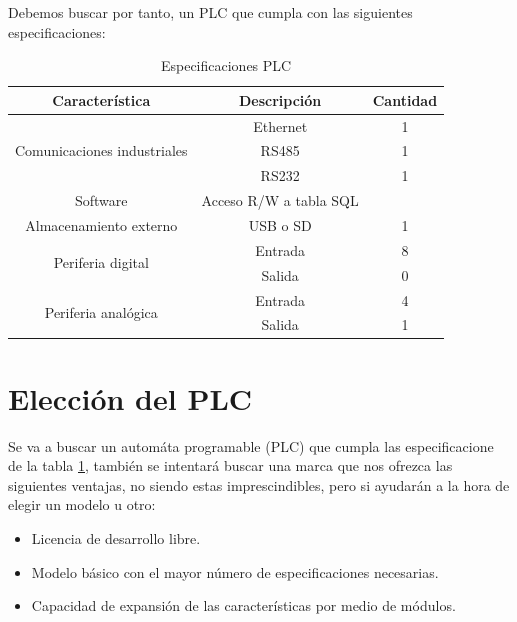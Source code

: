 Debemos buscar por tanto, un PLC que cumpla con las siguientes especificaciones:

\begin{table}[H]
\centering
\begin{tabular}{|c|c|c|}
\hline
\textbf{Característica }                              & \textbf{Descripción}            & \textbf{Cantidad} \\ \hline
\multirow{3}{*}{Comunicaciones industriales} & Ethernet               & 1        \\ \cline{2-3} 
                                             & RS485                  & 1        \\ \cline{2-3} 
                                             & RS232                  & 1        \\ \hline
Software                                     & Acceso R/W a tabla SQL &          \\ \hline
Almacenamiento externo                       & USB o SD               & 1        \\ \hline
\multirow{2}{*}{Periferia digital}           & Entrada                & 8        \\ \cline{2-3} 
                                             & Salida                 & 0        \\ \hline
\multirow{2}{*}{Periferia analógica}         & Entrada                & 4        \\ \cline{2-3} 
                                             & Salida                 & 1        \\ \hline
\end{tabular}
\caption{Especificaciones PLC}
\label{tab:espc_plc}
\end{table}

\section{Elección del PLC}
\label{eleccion_PLC}

Se va a buscar un automáta programable (PLC) que cumpla las especificacione de la tabla \ref{tab:espc_plc}, también se intentará buscar una marca que nos ofrezca las siguientes ventajas, no siendo estas imprescindibles, pero si ayudarán a la hora de elegir un modelo u otro:

\begin{itemize}
		\item{Licencia de desarrollo libre.}
		\item{Modelo básico con el mayor número de especificaciones necesarias.}
		\item{Capacidad de expansión de las características por medio de módulos.}
\end{itemize}

